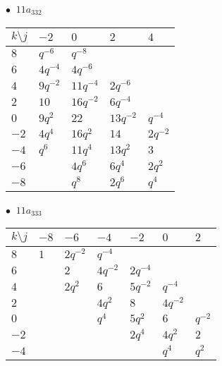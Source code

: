 \begin{minipage}{\linewidth}
$\bullet\ $ $11a_{332}$ \vspace{0.5em} \\
\begin{tabular}{l|llll}
$k \setminus j$ & $-2$ & $0$ & $2$ & $4$ \\
\hline
$8$ & $q^{-6}$ & $q^{-8}$ &  &  \\
$6$ & $4q^{-4}$ & $4q^{-6}$ &  &  \\
$4$ & $9q^{-2}$ & $11q^{-4}$ & $2q^{-6}$ &  \\
$2$ & $10$ & $16q^{-2}$ & $6q^{-4}$ &  \\
$0$ & $9q^{2}$ & $22$ & $13q^{-2}$ & $q^{-4}$ \\
$-2$ & $4q^{4}$ & $16q^{2}$ & $14$ & $2q^{-2}$ \\
$-4$ & $q^{6}$ & $11q^{4}$ & $13q^{2}$ & $3$ \\
$-6$ &  & $4q^{6}$ & $6q^{4}$ & $2q^{2}$ \\
$-8$ &  & $q^{8}$ & $2q^{6}$ & $q^{4}$ \\
\end{tabular}
\vspace{2em}
\end{minipage}
%
\begin{minipage}{\linewidth}
$\bullet\ $ $11a_{333}$ \vspace{0.5em} \\
\begin{tabular}{l|llllll}
$k \setminus j$ & $-8$ & $-6$ & $-4$ & $-2$ & $0$ & $2$ \\
\hline
$8$ & $1$ & $2q^{-2}$ & $q^{-4}$ &  &  &  \\
$6$ &  & $2$ & $4q^{-2}$ & $2q^{-4}$ &  &  \\
$4$ &  & $2q^{2}$ & $6$ & $5q^{-2}$ & $q^{-4}$ &  \\
$2$ &  &  & $4q^{2}$ & $8$ & $4q^{-2}$ &  \\
$0$ &  &  & $q^{4}$ & $5q^{2}$ & $6$ & $q^{-2}$ \\
$-2$ &  &  &  & $2q^{4}$ & $4q^{2}$ & $2$ \\
$-4$ &  &  &  &  & $q^{4}$ & $q^{2}$ \\
\end{tabular}
\vspace{2em}
\end{minipage}
%

